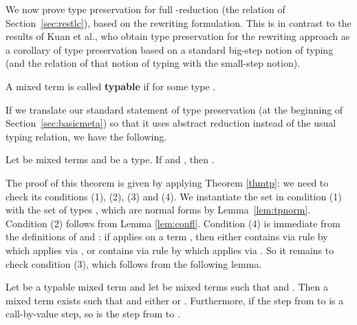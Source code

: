 \documentclass{LMCS}
\begin{document}
We now prove type preservation for full -reduction (the 
relation of Section~\ref{sec:restlc}), based on the rewriting
formulation.  This is in contrast to the results of Kuan et al., who
obtain type preservation for the rewriting approach as a corollary of
type preservation based on a standard big-step notion of typing (and
the relation of that notion of typing with the small-step notion).  

\begin{defi}[Typability]
A mixed term  is called \textbf{typable} 
if  for some type .  
\end{defi}

\noindent If we translate our standard statement of type preservation (at the
beginning of Section~\ref{sec:basicmeta}) so that it uses abstract
reduction instead of the usual typing relation, we have the following.

\begin{thm}
\label{thm:presstlc}
Let  be mixed terms and  be a type.
If  and , then .
\end{thm}

\noindent The proof of this theorem is given by applying Theorem
\ref{thmtp}: we need to check its conditions (1), (2), (3) and (4). We
instantiate the set  in condition (1) with the set of types ,
which are normal forms by Lemma~\ref{lem:tpnorm}.  Condition (2)
follows from Lemma \ref{lem:confl}. Condition (4) is immediate from
the definitions of  and : if  applies on a
term , then  either contains  via rule
 by which  applies via , or
 contains  via rule  by which
   applies via . So it remains to check condition
  (3), which follows from the following lemma.

\begin{lem}
\label{lem:beta}
Let  be a typable mixed term and let  be mixed terms
such that  and . Then a mixed term  exists such that  and 
either  or . Furthermore, if the step
from  to  is a call-by-value step, so is the step from 
to .
\end{lem}
\end{document}
